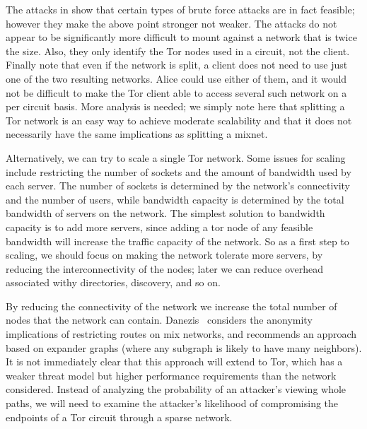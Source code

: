 \documentclass{llncs}
\begin{document}
The attacks in \cite{attack-tor-oak05} show that certain types of
brute force attacks are in fact feasible; however they make the
above point stronger not weaker. The attacks do not appear to be
significantly more difficult to mount against a network that is
twice the size. Also, they only identify the Tor nodes used in a
circuit, not the client. Finally note that even if the network is split,
a client does not need to use just one of the two resulting networks.
Alice could use either of them, and it would not be difficult to make
the Tor client able to access several such network on a per circuit
basis. More analysis is needed; we simply note here that splitting
a Tor network is an easy way to achieve moderate scalability and that
it does not necessarily have the same implications as splitting a mixnet.

Alternatively, we can try to scale a single Tor network.  Some issues for
scaling include restricting the number of sockets and the amount of bandwidth
used by each server.  The number of sockets is determined by the network's
connectivity and the number of users, while bandwidth capacity is determined
by the total bandwidth of servers on the network.  The simplest solution to
bandwidth capacity is to add more servers, since adding a tor node of any
feasible bandwidth will increase the traffic capacity of the network.  So as
a first step to scaling, we should focus on making the network tolerate more
servers, by reducing the interconnectivity of the nodes; later we can reduce
overhead associated withy directories, discovery, and so on.

By reducing the connectivity of the network we increase the total number of
nodes that the network can contain. Danezis~\cite{danezis-pet03} considers
the anonymity implications of restricting routes on mix networks, and
recommends an approach based on expander graphs (where any subgraph is likely
to have many neighbors).  It is not immediately clear that this approach will
extend to Tor, which has a weaker threat model but higher performance
requirements than the network considered.  Instead of analyzing the
probability of an attacker's viewing whole paths, we will need to examine the
attacker's likelihood of compromising the endpoints of a Tor circuit through
a sparse network.

\end{document}
